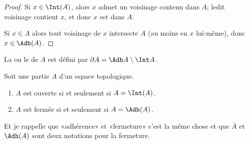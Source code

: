 \begin{proof}
	Si \( x\in \Int(A)\), alors \( x\) admet un voisinage contenu dans \( A\); ledit voisinage contient \( x\), et donc \( x\) est dans \( A\).

	Si \( x\in A\) alors tout voisinage de \( x\) intersecte \( A\) (au moins en \( x\) lui-même), donc \( x\in\Adh(A)\).
\end{proof}

\begin{definition}      \label{DEFooACVLooRwehTl}
	La  ou le  de \( A\) est défini par \( \partial A = \Adh A \setminus \Int A\).
\end{definition}

\begin{lemma}       \label{LEMooMPZWooGrqYIX}
	Soit une partie \( A\) d'un espace topologique.
	\begin{enumerate}
		\item		\label{ITEMooNBSCooXJcVos}
		      \( A\) est ouverte si et seulement si \( A = \Int(A)\).
		\item		\label{ITEMooDCIOooQAvCqI}
		      \( A\) est fermée si et seulement si \( A = \Adh(A)\).
	\end{enumerate}
	Et je rappelle que «adhérence» et «fermeture» c'est la même chose et que \( \bar A\) et \( \Adh(A)\) sont deux notations pour la fermeture.
\end{lemma}

